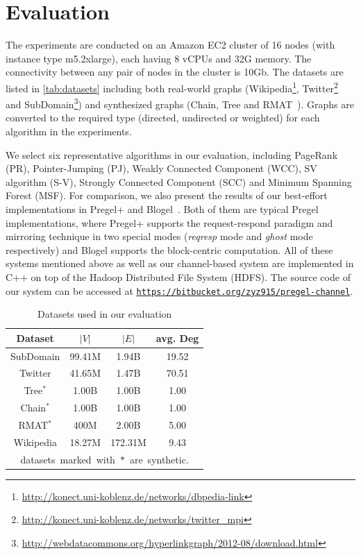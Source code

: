 \documentclass{sokendai_thesis} %
\newcommand{\CC}{C++}
\newcommand{\PP}{Pregel+}
\begin{document}
\section{Evaluation}

The experiments are conducted on an Amazon EC2 cluster of 16 nodes (with instance type m5.2xlarge), each having 8 vCPUs and 32G memory.
The connectivity between any pair of nodes in the cluster is 10Gb.
The datasets are listed in \autoref{tab:datasets} including both real-world graphs (Wikipedia\footnote{\small\url{http://konect.uni-koblenz.de/networks/dbpedia-link}}, Twitter\footnote{\small\url{http://konect.uni-koblenz.de/networks/twitter_mpi}} and SubDomain\footnote{\small\url{http://webdatacommons.org/hyperlinkgraph/2012-08/download.html}}) and synthesized graphs (Chain, Tree and RMAT~\cite{rmat}).
Graphs are converted to the required type (directed, undirected or weighted) for each algorithm in the experiments.

We select six representative algorithms in our evaluation, including PageRank (PR), Pointer-Jumping (PJ), Weakly Connected Component (WCC), SV algorithm (S-V), Strongly Connected Component (SCC) and Minimum Spanning Forest (MSF).
For comparison, we also present the results of our best-effort implementations in \PP{} \cite{yan2015effective} and Blogel~\cite{yan2014blogel}.
Both of them are typical Pregel implementations, where \PP{} supports the request-respond paradigm and mirroring technique in two special modes (\textit{reqresp} mode and \textit{ghost} mode respectively) and Blogel supports the block-centric computation.
All of these systems mentioned above as well as our channel-based system are implemented in \CC{} on top of the Hadoop Distributed File System (HDFS).
The source code of our system can be accessed at \texttt{\url{https://bitbucket.org/zyz915/pregel-channel}}.

\begin{table}[t]
\centering
\caption{Datasets used in our evaluation}
\label{tab:datasets}
\begin{tabular}{c|c|c|c}
\hline
\textbf{Dataset} & $|V|$ & $|E|$ & avg. Deg \\
\hline\hline
SubDomain & 99.41M & 1.94B & 19.52 \\
\hline
Twitter & 41.65M & 1.47B & 70.51 \\
\hline
Tree$^{*}$ & 1.00B & 1.00B & 1.00 \\
\hline
Chain$^{*}$ & 1.00B & 1.00B & 1.00 \\
\hline
RMAT$^{*}$ &  400M & 2.00B & 5.00 \\
\hline
Wikipedia & 18.27M & 172.31M & 9.43 \\
\hline
\multicolumn{4}{c}{\hbox{datasets marked with $*$ are synthetic.}}
\end{tabular}
\end{table}
\end{document}
